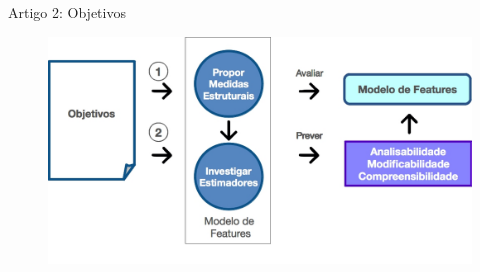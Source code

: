 \begin{frame}{Artigo 2: Objetivos}        
  \begin{figure}[hbt]
    \includegraphics[scale=0.4]{imagens/artigo2-objetivos.jpg}
  \end{figure}
\end{frame}